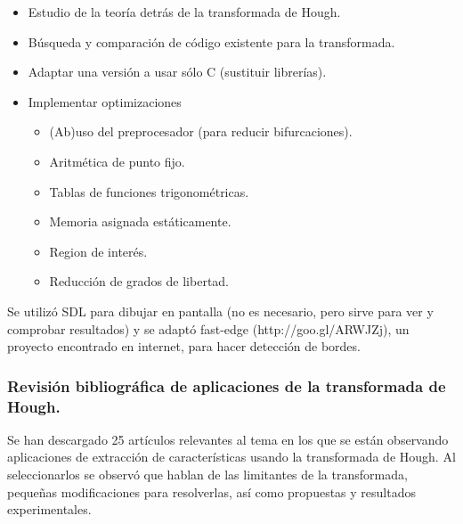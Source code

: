 \begin{itemize}
	\item Estudio de la teoría detrás de la transformada de Hough.
	\item Búsqueda y comparación de código existente para la transformada.
	\item Adaptar una versión a usar sólo C (sustituir librerías).
	\item Implementar optimizaciones
	\begin{itemize}
		\item (Ab)uso del preprocesador (para reducir bifurcaciones). 
		\item Aritmética de punto fijo.
		\item Tablas de funciones trigonométricas.
		\item Memoria asignada estáticamente.
		\item Region de interés.
		\item Reducción de grados de libertad.
	\end{itemize}
\end{itemize}

Se utilizó SDL para dibujar en pantalla (no es necesario, pero sirve para ver y comprobar resultados) y se adaptó fast-edge (http://goo.gl/ARWJZj), un proyecto encontrado en internet, para hacer detección de bordes.


\subsubsection[Revisión bibliográfica transformada de Hough.]{Revisión bibliográfica de aplicaciones de la transformada de Hough.}
Se han descargado 25 artículos relevantes al tema en los que se están observando aplicaciones de extracción de características usando la transformada de Hough. Al seleccionarlos se observó que hablan de las limitantes de la transformada, pequeñas modificaciones para resolverlas, así como propuestas y resultados experimentales.

